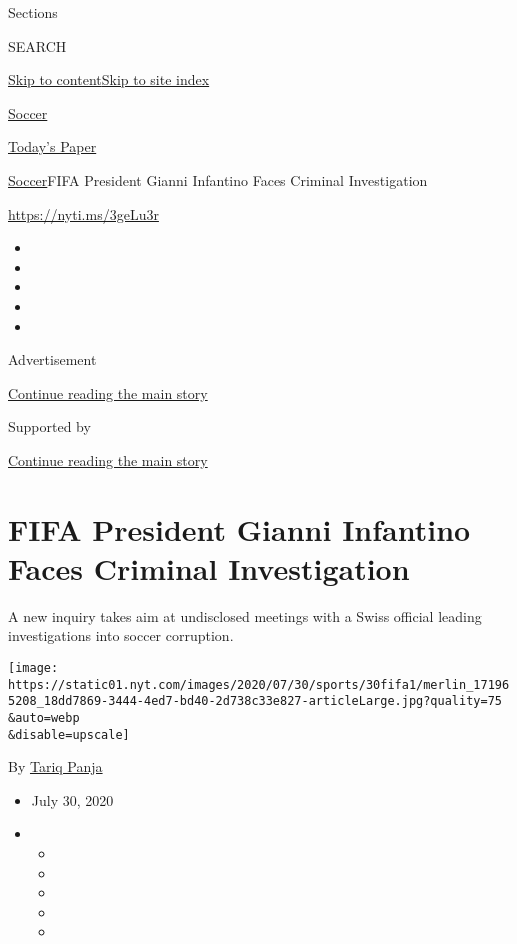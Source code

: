 Sections

SEARCH

\protect\hyperlink{site-content}{Skip to
content}\protect\hyperlink{site-index}{Skip to site index}

\href{https://www.nytimes.com/section/sports/soccer}{Soccer}

\href{https://myaccount.nytimes.com/auth/login?response_type=cookie\&client_id=vi}{}

\href{https://www.nytimes.com/section/todayspaper}{Today's Paper}

\href{/section/sports/soccer}{Soccer}\textbar{}FIFA President Gianni
Infantino Faces Criminal Investigation

\url{https://nyti.ms/3geLu3r}

\begin{itemize}
\item
\item
\item
\item
\item
\end{itemize}

Advertisement

\protect\hyperlink{after-top}{Continue reading the main story}

Supported by

\protect\hyperlink{after-sponsor}{Continue reading the main story}

\hypertarget{fifa-president-gianni-infantino-faces-criminal-investigation}{%
\section{FIFA President Gianni Infantino Faces Criminal
Investigation}\label{fifa-president-gianni-infantino-faces-criminal-investigation}}

A new inquiry takes aim at undisclosed meetings with a Swiss official
leading investigations into soccer corruption.

\texttt{[image: https://static01.nyt.com/images/2020/07/30/sports/30fifa1/merlin\_171965208\_18dd7869-3444-4ed7-bd40-2d738c33e827-articleLarge.jpg?quality=75\\\&auto=webp\\\&disable=upscale]}

By \href{https://www.nytimes.com/by/tariq-panja}{Tariq Panja}

\begin{itemize}
\item
  July 30, 2020
\item
  \begin{itemize}
  \item
  \item
  \item
  \item
  \item
  \end{itemize}
\end{itemize}

